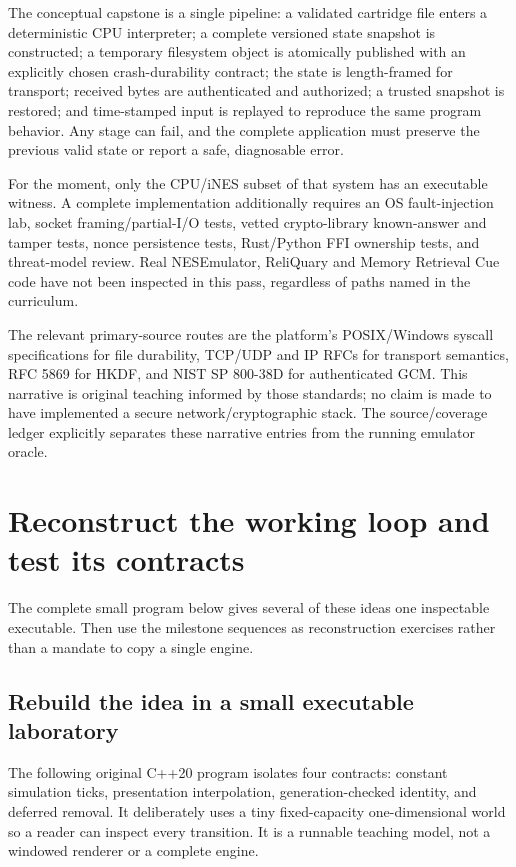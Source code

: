 The conceptual capstone is a single pipeline: a validated cartridge file enters a deterministic CPU interpreter; a complete versioned state snapshot is constructed; a temporary filesystem object is atomically published with an explicitly chosen crash-durability contract; the state is length-framed for transport; received bytes are authenticated and authorized; a trusted snapshot is restored; and time-stamped input is replayed to reproduce the same program behavior. Any stage can fail, and the complete application must preserve the previous valid state or report a safe, diagnosable error.

For the moment, only the CPU/iNES subset of that system has an executable witness. A complete implementation additionally requires an OS fault-injection lab, socket framing/partial-I/O tests, vetted crypto-library known-answer and tamper tests, nonce persistence tests, Rust/Python FFI ownership tests, and threat-model review. Real NESEmulator, ReliQuary and Memory Retrieval Cue code have not been inspected in this pass, regardless of paths named in the curriculum.

The relevant primary-source routes are the platform's POSIX/Windows syscall specifications for file durability, TCP/UDP and IP RFCs for transport semantics, RFC 5869 for HKDF, and NIST SP 800-38D for authenticated GCM. This narrative is original teaching informed by those standards; no claim is made to have implemented a secure network/cryptographic stack. The source/coverage ledger explicitly separates these narrative entries from the running emulator oracle.

\section{Reconstruct the working loop and test its contracts}\label{06-engine-ii-ch042-reconstruct-the-working-loop-and-test-its-contracts}

The complete small program below gives several of these ideas one inspectable executable. Then use the milestone sequences as reconstruction exercises rather than a mandate to copy a single engine.

\subsection{Rebuild the idea in a small executable laboratory}\label{06-engine-ii-ch042-rebuild-the-idea-in-a-small-executable-laboratory}

The following original C++20 program isolates four contracts: constant simulation ticks, presentation interpolation, generation-checked identity, and deferred removal. It deliberately uses a tiny fixed-capacity one-dimensional world so a reader can inspect every transition. It is a runnable teaching model, not a windowed renderer or a complete engine.

